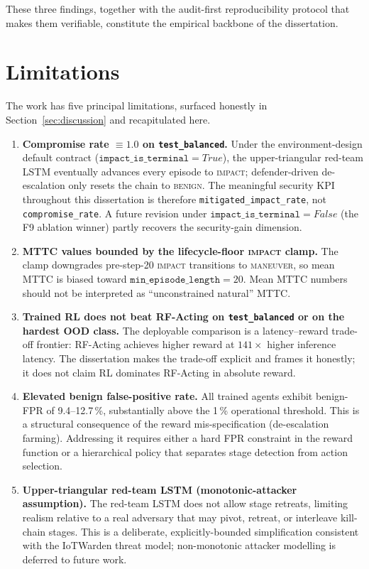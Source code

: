These three findings, together with the audit-first reproducibility protocol that makes them verifiable, constitute the empirical backbone of the dissertation.

\section{Limitations}\label{sec:limitations}
The work has five principal limitations, surfaced honestly in Section~\ref{sec:discussion} and recapitulated here.

\begin{enumerate}
    \item \textbf{Compromise rate $\equiv 1.0$ on \texttt{test\_balanced}.} Under the environment-design default contract ($\texttt{impact\_is\_terminal}=\mathit{True}$), the upper-triangular red-team LSTM eventually advances every episode to \textsc{impact}; defender-driven de-escalation only resets the chain to \textsc{benign}. The meaningful security KPI throughout this dissertation is therefore \texttt{mitigated\_impact\_rate}, not \texttt{compromise\_rate}. A future revision under $\texttt{impact\_is\_terminal}=\mathit{False}$ (the F9 ablation winner) partly recovers the security-gain dimension.

    \item \textbf{MTTC values bounded by the lifecycle-floor \textsc{impact} clamp.} The clamp downgrades pre-step-20 \textsc{impact} transitions to \textsc{maneuver}, so mean MTTC is biased toward $\texttt{min\_episode\_length} = 20$. Mean MTTC numbers should not be interpreted as ``unconstrained natural'' MTTC.

    \item \textbf{Trained RL does not beat RF-Acting on \texttt{test\_balanced} or on the hardest OOD class.} The deployable comparison is a latency--reward trade-off frontier: RF-Acting achieves higher reward at $141\times$ higher inference latency. The dissertation makes the trade-off explicit and frames it honestly; it does not claim RL dominates RF-Acting in absolute reward.

    \item \textbf{Elevated benign false-positive rate.} All trained agents exhibit benign-FPR of 9.4--12.7\,\%, substantially above the 1\,\% operational threshold. This is a structural consequence of the reward mis-specification (de-escalation farming). Addressing it requires either a hard FPR constraint in the reward function or a hierarchical policy that separates stage detection from action selection.

    \item \textbf{Upper-triangular red-team LSTM (monotonic-attacker assumption).} The red-team LSTM does not allow stage retreats, limiting realism relative to a real adversary that may pivot, retreat, or interleave kill-chain stages. This is a deliberate, explicitly-bounded simplification consistent with the IoTWarden threat model; non-monotonic attacker modelling is deferred to future work.
\end{enumerate}

